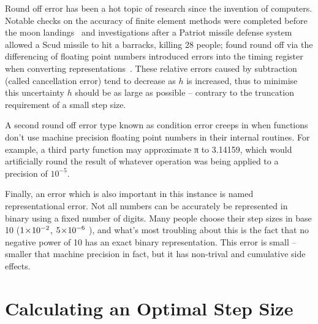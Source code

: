 Round off error has been a hot topic of research since the invention of computers.
Notable checks on the accuracy of finite element methods were completed before the moon landings~\cite{Cyrus1968} and investigations after a Patriot missile defense system allowed a Scud missile to hit a barracks, killing 28 people; found round off via the differencing of floating point numbers introduced errors into the timing register when converting representations~\cite{Skeel1992}.
These relative errors caused by subtraction (called cancellation error) tend to decrease as $h$ is increased, thus to minimise this uncertainty $h$ should be as large as possible -- contrary to the truncation requirement of a small step size.

A second round off error type known as condition error creeps in when functions don't use machine precision floating point numbers in their internal routines.
For example, a third party function may approximate π to 3.14159, which would artificially round the result of whatever operation was being applied to a precision of $10^{-5}$.

Finally, an error which is also important in this instance is named representational error.
Not all numbers can be accurately be represented in binary using a fixed number of digits.
Many people choose their step sizes in base 10 (\eg $1\!\times\!10^{-2}$, $5\!\times\!10^{-6}$ \etc), and what's most troubling about this is the fact that no negative power of 10 has an exact binary representation.
This error is small -- smaller that machine precision in fact, but it has non-trival and cumulative side effects.

\section{Calculating an Optimal Step Size}\label{sec:hopt}
\cite{Mathur2012}



